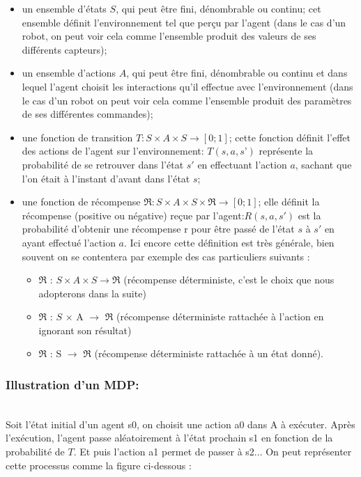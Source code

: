 \documentclass{article}
\begin{document}
\begin{itemize}
    \item un ensemble d'états $S$, qui peut être fini, dénombrable ou continu; cet ensemble définit l'environnement tel que perçu par l'agent (dans le cas d'un robot, on peut voir cela comme l'ensemble produit des valeurs de ses différents capteurs);
    \item un ensemble d'actions $A$, qui peut être fini, dénombrable ou continu et dans lequel l'agent choisit les interactions qu'il effectue avec l'environnement (dans le cas d'un robot on peut voir cela comme l'ensemble produit des paramètres de ses différentes commandes);
    \item une fonction de transition $ T : S \times A \times S \to [0;1] $; cette fonction définit l'effet des actions de l'agent sur l'environnement: $T(s, a, s’)$ représente la probabilité de se retrouver dans l'état $s'$ en effectuant l'action $a$, sachant que l'on était à l'instant d'avant dans l'état $s$;
    \item une fonction de récompense $ \Re : S \times A \times S \times \Re \to [0;1]$; elle définit la récompense (positive ou négative) reçue par l'agent:$ R(s,a,s')$ est la probabilité d'obtenir une récompense r pour être passé de l'état $s$ à $s'$ en ayant effectué l'action $a$. Ici encore cette définition est très générale, bien souvent on se contentera par exemple des cas particuliers suivants :
    \begin{itemize}
        \item $\Re$ : $S \times A \times S \to \Re$ (récompense déterministe, c'est le choix que nous adopterons dans la suite)
        \item $\Re$ : $S$ $\times$ A $\to$ $\Re$ (récompense déterministe rattachée à l'action en ignorant son résultat)
        \item $\Re$ : S $\to$ $\Re$ (récompense déterministe rattachée à un état donné).
    \end{itemize}
\end{itemize}

\subsubsection{Illustration d'un MDP:}\\
\noindent Soit l’état initial d’un agent s0, on choisit une action a0 dans A à exécuter. Après l'exécution, l’agent passe aléatoirement à l’état prochain s1 en fonction de la probabilité de $T$. Et puis l’action a1 permet de passer à s2... On peut représenter cette processus comme la figure ci-dessous : 
\end{document}
